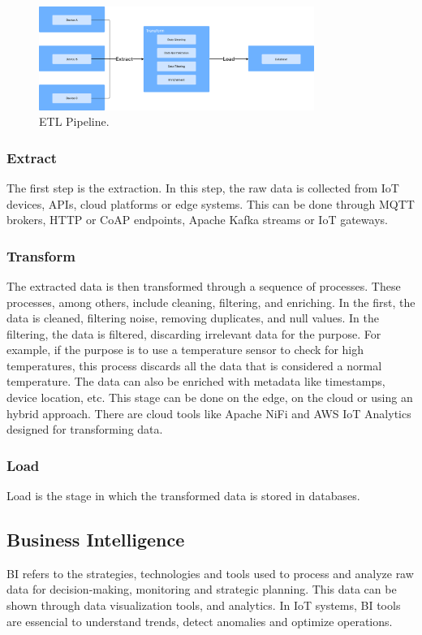 \begin{figure}[htbp]
	\centering
	\includegraphics[width=0.8\textwidth, height=0.5\textheight, keepaspectratio]{Chapters/Figures/ETL/ETL.pdf}
	\caption{\gls{ETL} Pipeline.}
	\label{fig:etl:pipeline}
\end{figure}

\subsubsection{Extract}
The first step is the extraction. In this step, the raw data is collected from
\gls{IoT} devices, \gls{API}s, cloud platforms or edge systems. This can be done through
\gls{MQTT} brokers, \gls{HTTP} or \gls{CoAP} endpoints, Apache Kafka streams or \gls{IoT} gateways.

\subsubsection{Transform}
The extracted data is then transformed through a sequence of processes. These
processes, among others, include cleaning, filtering, and enriching.
In the first, the data is cleaned, filtering noise, removing duplicates, and
null values. In the filtering, the data is filtered, discarding irrelevant data
for the purpose. For example, if the purpose is to use a temperature sensor to
check for high temperatures, this process discards all the data that is
considered a normal temperature. The data can also be enriched with metadata
like timestamps, device location, etc. This stage can be done on the edge, on
the cloud or using an hybrid approach. There are cloud tools like Apache NiFi
and \gls{AWS} \gls{IoT} Analytics designed for transforming data.

\subsubsection{Load}
Load is the stage in which the transformed data is stored in databases.

\subsection{Business Intelligence}
\gls{BI} refers to the strategies, technologies and tools used to process and
analyze raw data for decision-making, monitoring and strategic planning.
This data can be shown through data visualization tools, and analytics.
In \gls{IoT} systems, \gls{BI} tools are essencial to understand trends, detect
anomalies and optimize operations.

